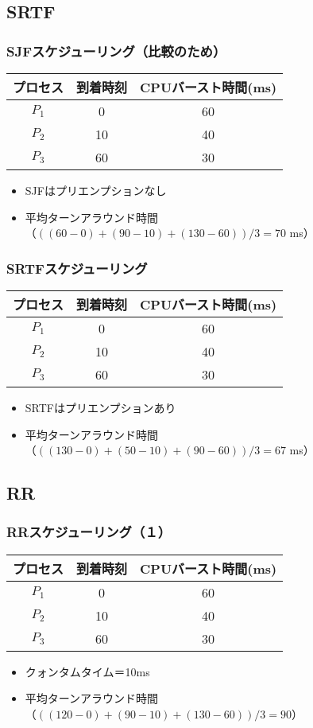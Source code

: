 \documentclass{beamer}                   %
\begin{document}
\subsection{SRTF}
\begin{frame}
  \frametitle{SJFスケジューリング（比較のため）}
  \small\begin{tabular}{c c c}
    プロセス & 到着時刻 & CPUバースト時間(ms) \\
    \hline
    $P_1$    & 0  & 60 \\
    $P_2$    & 10 & 40 \\
    $P_3$    & 60 & 30 \\
  \end{tabular}
  \begin{itemize}
    \item SJFはプリエンプションなし
    \item 平均ターンアラウンド時間\\
      （$((60-0)+(90-10)+(130-60))/3=70$ ms）
  \end{itemize}
\end{frame}

\begin{frame}
  \frametitle{SRTFスケジューリング}
  \small\begin{tabular}{c c c}
    プロセス & 到着時刻 & CPUバースト時間(ms) \\
    \hline
    $P_1$    & 0  & 60 \\
    $P_2$    & 10 & 40 \\
    $P_3$    & 60 & 30 \\
  \end{tabular}
  \begin{itemize}
    \item SRTFはプリエンプションあり
    \item 平均ターンアラウンド時間\\
      （$((130-0)+(50-10)+(90-60))/3=67$ ms）
  \end{itemize}
\end{frame}

\subsection{RR}
\begin{frame}
  \frametitle{RRスケジューリング（１）}
  \small\begin{tabular}{c c c}
    プロセス & 到着時刻 & CPUバースト時間(ms) \\
    \hline
    $P_1$    & 0  & 60 \\
    $P_2$    & 10 & 40 \\
    $P_3$    & 60 & 30 \\
  \end{tabular}
  \begin{itemize}
    \item クォンタムタイム＝10ms
    \item 平均ターンアラウンド時間\\
      （$((120-0)+(90-10)+(130-60))/3=90$）
  \end{itemize}
\end{frame}
\end{document}
